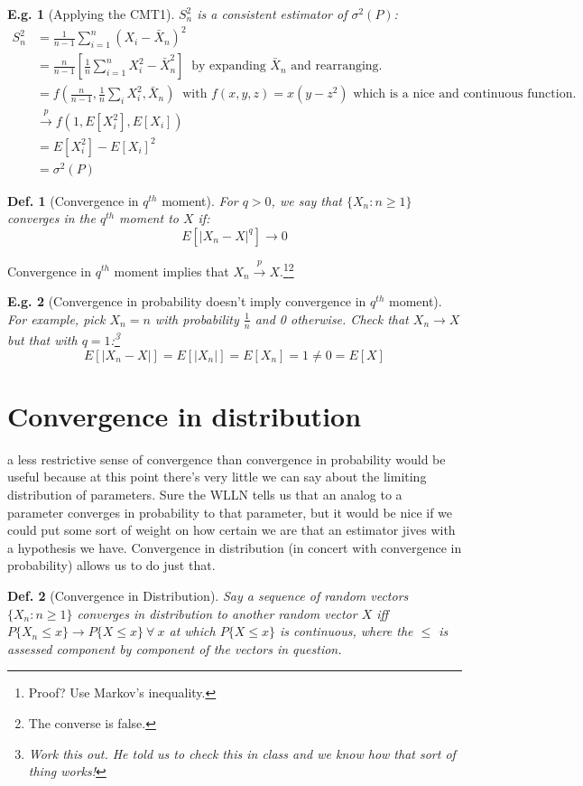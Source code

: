 \documentclass{tufte-book}
\theoremstyle{mytheoremstyle}
\theoremstyle{mylemstyle}
\theoremstyle{mydefstyle}
\newtheorem*{mydef}{Def.}
\newtheorem*{ex}{E.g.}
\begin{document}
\begin{ex}[Applying the CMT1] \(S^2_n\) is a consistent estimator of \(\sigma^2(P)\):
	\begin{align*}
		S^2_n & = \frac{1}{n-1}\sum_{i = 1}^n (X_i - \bar{X}_n)^2 \\
			  & = \frac{n}{n-1}\left[\frac{1}{n} \sum_{i = 1}^n X_i^2 - \bar{X}_n^2\right]\ \text{ by expanding \(\bar{X}_n\) and rearranging.} \\
		   	  & = f\left(\frac{n}{n-1}, \frac{1}{n}\sum_i X_i^2, \bar{X}_n\right)\ \text{ with \(f(x,y,z) = x(y-z^2)\) which is a nice and continuous function. }\\
			& \overset{p}{\rightarrow} f(1, E[X_i^2], E[X_i]) \\
			& = E[X_i^2] - E[X_i]^2 \\
			& = \sigma^2(P)
	\end{align*}
\end{ex}

\begin{mydef}[Convergence in \(q^{th}\) moment] For \(q > 0\), we say that \(\{X_n: n \ge 1\}\) converges in the \(q^{th}\) moment to \(X\) if:
	\[E[|X_n - X|^q] \rightarrow 0\]
\end{mydef}
Convergence in \(q^{th}\) moment implies that \(X_n \overset{p}{\rightarrow} X\).\footnote{Proof? Use Markov's inequality.}\footnote{The converse is false.}

\begin{ex}[Convergence in probability doesn't imply convergence in \(q^{th}\) moment] For example, pick \(X_n = n\) with probability \(\frac{1}{n}\) and 0 otherwise. Check that \(X_n \rightarrow X\) but that with \(q = 1\):\footnote{Work this out. He told us to check this in class and we know how that sort of thing works!}
	\[E[|X_n - X|] = E[|X_n|] = E[X_n] = 1 \ne 0 = E[X]\]
\end{ex}

\section{Convergence in distribution}
 a less restrictive sense of convergence than convergence in probability would be useful because at this point there's very little we can say about the limiting distribution of parameters. Sure the WLLN tells us that an analog to a parameter converges in probability to that parameter, but it would be nice if we could put some sort of weight on how certain we are that an estimator jives with a hypothesis we have. Convergence in distribution (in concert with convergence in probability) allows us to do just that.
\begin{mydef}[Convergence in Distribution] Say a sequence of random vectors \(\{X_n: n \ge 1\}\) converges in distribution to another random vector \(X\) iff \(P\{X_n \le x\} \rightarrow P\{X \le x\}\ \forall\ x\) at which \(P\{X \le x\}\) is continuous, where the \(\le\) is assessed component by component of the vectors in question. 
\end{mydef}
\end{document}
